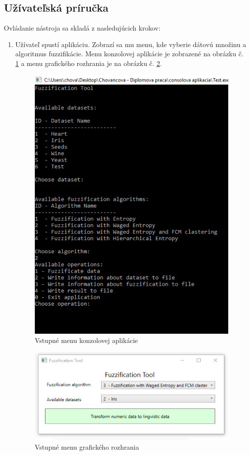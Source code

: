 \subsection{Užívateľská príručka}
Ovládanie nástroja sa skladá z nasledujúcich krokov: 
\begin{enumerate}
\item Užívateľ spustí aplikáciu. Zobrazí sa mu menu, kde vyberie dátovú množinu a algoritmus fuzzifikácie. Menu konzolovej aplikácie je zobrazené na obrázku č. \ref{fig:konzolova_aplikaci} a menu grafického rozhrania je na obrázku č. \ref{fig:guivstupnemenu}. 

\begin{figure}[hp!]
\includegraphics[]{obrazky/konzolova_aplikacia_-_vyberr_operacie.PNG}
\centering
\caption{Vstupné menu konzolovej aplikácie } 
\label{fig:konzolova_aplikaci}
\end{figure}

\begin{figure}[hp!]
\includegraphics[]{obrazky/vyber_datasetu_a_algoritmu.PNG}
\centering
\caption{Vstupné menu grafického rozhrania } 
\label{fig:guivstupnemenu}
\end{figure}


\end{enumerate}
